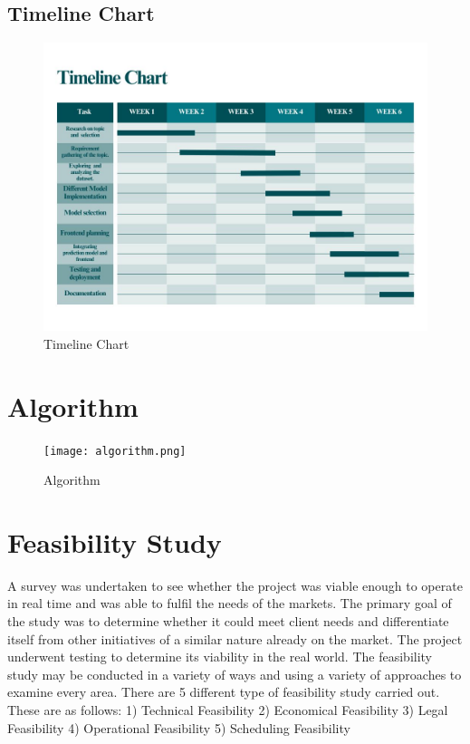 \documentclass[a4paper, 12pt]{report}
\begin{document}
\subsection{Timeline Chart }
\begin{figure}[h]
\centering
\includegraphics[width=1\linewidth]{Timeline chart.jpeg}
\caption{Timeline Chart}
\end{figure}
\pagebreak
\section{Algorithm }
\begin{figure}[h]
\centering
\texttt{[image: algorithm.png]}
\caption{Algorithm}
\end{figure}

\section{Feasibility Study }
\par A survey was undertaken to see whether the project was viable enough to operate in real time and was able to fulfil the needs of the markets. The primary goal of the study was to determine whether it could meet client needs and differentiate itself from other initiatives of a similar nature already on the market. The project underwent testing to determine its viability in the real world. The feasibility study may be conducted in a variety of ways and using a variety of approaches to examine every area.
There are 5 different type of feasibility study carried out. These are as follows:
1) Technical Feasibility
2) Economical Feasibility
3) Legal Feasibility
4) Operational Feasibility
5) Scheduling Feasibility
\end{document}
